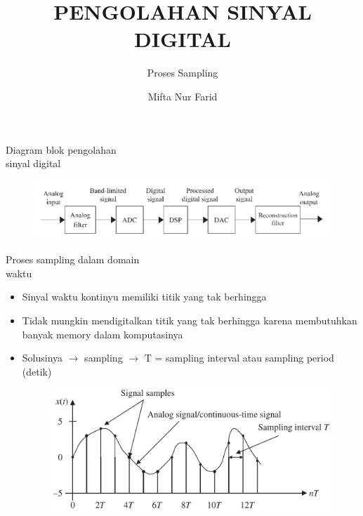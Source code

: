 \documentclass[pdflatex,compress,mathserif]{beamer}
\title{PENGOLAHAN SINYAL DIGITAL}
\subtitle{Proses Sampling}
\author{Mifta Nur Farid}
\begin{document}
\maketitle

\begin{frame}{Diagram blok pengolahan\\sinyal digital}
    \begin{figure}
        \includegraphics[width=\linewidth]{./img/img01.png}
    \end{figure}
\end{frame}

\begin{frame}{Proses sampling dalam domain\\waktu}
    \begin{itemize}
        \item Sinyal waktu kontinyu memiliki titik yang tak berhingga
        \item Tidak mungkin mendigitalkan titik yang tak berhingga karena membutuhkan banyak memory dalam komputasinya
        \item Solusinya $\rightarrow$ sampling $\rightarrow$ T = sampling interval atau sampling period (detik)
        \begin{figure}
            \includegraphics[width=0.9\linewidth]{./img/img02.png}
        \end{figure}
    \end{itemize}
\end{frame}
\end{document}
